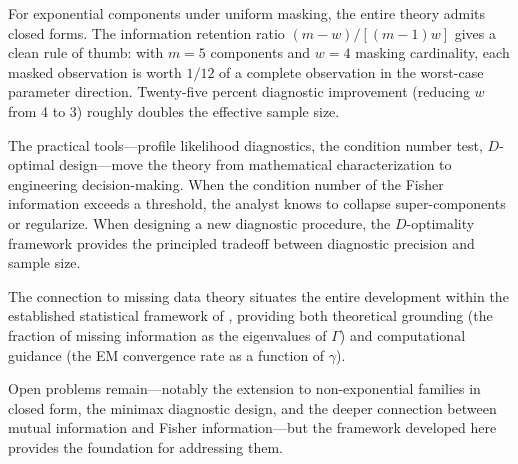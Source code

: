 \documentclass[11pt]{article}
\theoremstyle{definition}
\theoremstyle{plain}
\begin{document}
For exponential components under uniform masking, the entire theory
admits closed forms.
The information retention ratio $(m-w)/[(m-1)w]$ gives a clean rule
of thumb: with $m = 5$ components and $w = 4$ masking cardinality,
each masked observation is worth $1/12$ of a complete observation in
the worst-case parameter direction.
Twenty-five percent diagnostic improvement (reducing $w$ from 4 to 3)
roughly doubles the effective sample size.

The practical tools---profile likelihood diagnostics, the condition
number test, $D$-optimal design---move the theory from mathematical
characterization to engineering decision-making.
When the condition number of the Fisher information exceeds a
threshold, the analyst knows to collapse super-components or
regularize.
When designing a new diagnostic procedure, the $D$-optimality
framework provides the principled tradeoff between diagnostic
precision and sample size.

The connection to missing data theory situates the entire development
within the established statistical framework of \citet{little2002},
providing both theoretical grounding (the fraction of missing
information as the eigenvalues of $\Gamma$) and computational
guidance (the EM convergence rate as a function of $\gamma$).

Open problems remain---notably the extension to non-exponential
families in closed form, the minimax diagnostic design, and the
deeper connection between mutual information and Fisher
information---but the framework developed here provides the
foundation for addressing them.





\end{document}
